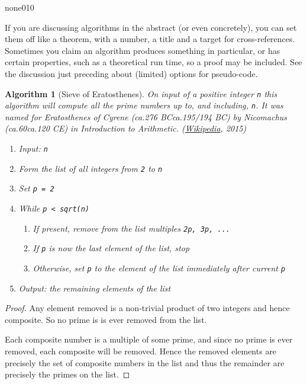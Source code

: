 \documentclass{sn-jnl}
\theoremstyle{thmstyleone}%
\theoremstyle{thmstyletwo}%
\newtheorem{algorithm}[theorem]{Algorithm}
\theoremstyle{thmstylethree}%
\newcommand{\mono}[1]{\texttt{#1}}
\newcommand{\pubtitle}[1]{\textsl{#1}}
\numberwithin{equation}{section}
\begin{document}
\begin{program}{none}{0}{1}{0}

\end{program}
If you are discussing algorithms in the abstract (or even concretely), you can set them off like a theorem, with a number, a title and a target for cross-references.  Sometimes you claim an algorithm produces something in particular, or has certain properties, such as a theoretical run time, so a proof may be included.  See the discussion just preceding about (limited) options for pseudo-code.%
\begin{algorithm}[Sieve of Eratosthenes]\label{algorithm-sieve-eratosthenes}%
%
On input of a positive integer \mono{n} this algorithm will compute all the prime numbers up to, and including, \mono{n}.  It was named for Eratosthenes of Cyrene (ca.\@ 276 BC\textendash{}ca.\@ 195\slash{}194 BC) by Nicomachus (ca.\@ 60\textendash{}ca.\@ 120 CE) in \pubtitle{Introduction to Arithmetic}. (\href{http://en.wikipedia.org/wiki/Sieve_of_Eratosthenes}{Wikipedia}\footnotemark{}, 2015)%
\begin{enumerate}
\item{}Input: \mono{n}%
\item{}Form the list of all integers from \mono{2} to \mono{n}%
\item{}Set \mono{p = 2}%
\item{}While \mono{p < sqrt(n)}%
\begin{enumerate}[label={\arabic*.}]
\item{}If present, remove from the list multiples \mono{2p, 3p, ...}%
\item{}If \mono{p} is now the last element of the list, stop%
\item{}Otherwise, set \mono{p} to the element of the list immediately after current \mono{p}%
\end{enumerate}
%
\item{}Output: the remaining elements of the list%
\end{enumerate}
%
\end{algorithm}
\begin{proof}\label{algorithm-sieve-eratosthenes-3}%
Any element removed is a non-trivial product of two integers and hence composite.  So no prime is is ever removed from the list.%
\par
Each composite number is a multiple of some prime, and since no prime is ever removed, each composite will be removed.  Hence the removed elements are precisely the set of composite numbers in the list and thus the remainder are precisely the primes on the list.%
\end{proof}
\end{document}
